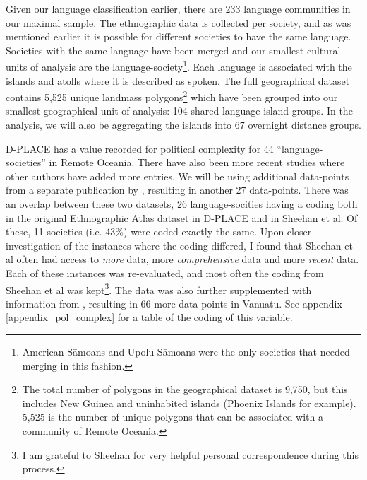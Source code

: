 \documentclass[unnumsec,webpdf,modern,medium]{oup-authoring-template}
\begin{document}
\begin{appendices}
Given our language classification earlier, there are 233 language communities in our maximal sample. The ethnographic data is collected per society, and as was mentioned earlier it is possible for different societies to have the same language. Societies with the same language have been merged and our smallest cultural units of analysis are the language-society\footnote{American S\={a}moans and Upolu S\={a}moans were the only societies that needed merging in this fashion.}. Each language is associated with the islands and atolls where it is described as spoken. The full geographical dataset contains 5,525 unique landmass polygons\footnote{The total number of polygons in the geographical dataset is 9,750, but this includes New Guinea and uninhabited islands (Phoenix Islands for example). 5,525 is the number of unique polygons that can be associated with a community of Remote Oceania.} which have been grouped into our smallest geographical unit of analysis: 104 shared language island groups. In the analysis, we will also be aggregating the islands into 67 overnight distance groups.

D-PLACE has a value recorded for political complexity for 44 ``language-societies'' in Remote Oceania. There have also been more recent studies where other authors have added more entries. We will be using additional data-points from a separate publication by \citet{sheehan2018coevolution}, resulting in another 27 data-points. There was an overlap between these two datasets, 26 language-socities having a coding both in the original Ethnographic Atlas dataset in D-PLACE and in Sheehan et al. Of these, 11 societies (i.e. 43\%) were coded exactly the same. Upon closer investigation of the instances where the coding differed, I found that Sheehan et al often had access to \textit{more} data, more \textit{comprehensive} data and more \textit{recent} data. Each of these instances was re-evaluated, and most often the coding from Sheehan et al was kept\footnote{I am grateful to Sheehan for very helpful personal correspondence during this process.}. The data was also further supplemented with information from \citet[201]{bonnemaison1996graded}, resulting in 66 more data-points in Vanuatu. See appendix \ref{appendix_pol_complex} for a table of the coding of this variable.



\end{appendices}
\end{document}
